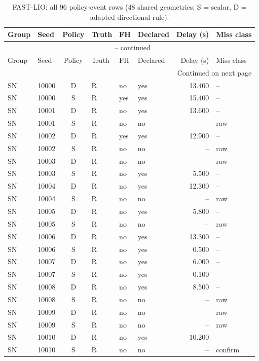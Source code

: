 \begingroup\footnotesize
\begin{longtable}{@{}llclllrl@{}}
\caption{FAST-LIO: all 96 policy-event rows (48 shared geometries; S = scalar, D = adapted directional rule).}\\
\toprule
Group & Seed & Policy & Truth & FH & Declared & Delay (s) & Miss class\\\midrule\endfirsthead
\multicolumn{8}{c}{\tablename\ \thetable{} -- continued}\\
\toprule
Group & Seed & Policy & Truth & FH & Declared & Delay (s) & Miss class\\\midrule\endhead
\midrule\multicolumn{8}{r}{Continued on next page}\\\endfoot
\bottomrule\endlastfoot
SN & 10000 & D & R & no & yes & 13.400 & --\\
SN & 10000 & S & R & yes & yes & 15.400 & --\\
SN & 10001 & D & R & no & yes & 13.600 & --\\
SN & 10001 & S & R & no & no & -- & raw\\
SN & 10002 & D & R & yes & yes & 12.900 & --\\
SN & 10002 & S & R & no & no & -- & raw\\
SN & 10003 & D & R & no & no & -- & raw\\
SN & 10003 & S & R & no & yes & 5.500 & --\\
SN & 10004 & D & R & no & yes & 12.300 & --\\
SN & 10004 & S & R & no & no & -- & raw\\
SN & 10005 & D & R & no & yes & 5.800 & --\\
SN & 10005 & S & R & no & no & -- & raw\\
SN & 10006 & D & R & no & yes & 13.300 & --\\
SN & 10006 & S & R & no & yes & 0.500 & --\\
SN & 10007 & D & R & no & yes & 6.000 & --\\
SN & 10007 & S & R & no & yes & 0.100 & --\\
SN & 10008 & D & R & no & yes & 8.500 & --\\
SN & 10008 & S & R & no & no & -- & raw\\
SN & 10009 & D & R & no & no & -- & raw\\
SN & 10009 & S & R & no & no & -- & raw\\
SN & 10010 & D & R & no & yes & 10.200 & --\\
SN & 10010 & S & R & no & no & -- & confirm\\

\end{longtable}
